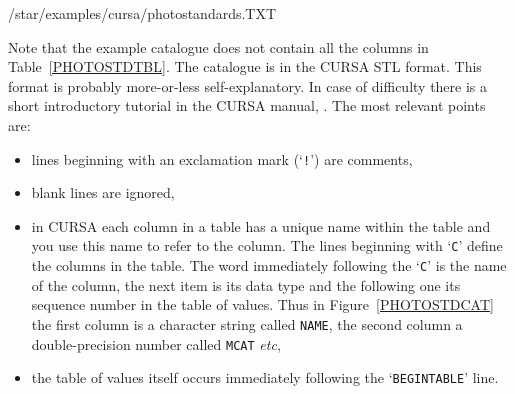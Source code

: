 \documentclass[twoside,11pt,nolof]{starlink}
\begin{document}
\begin{enumerate}
\begin{description}
\begin{terminalv}
/star/examples/cursa/photostandards.TXT
\end{terminalv}

     Note that the example catalogue does not contain all the columns
     in Table~\ref{PHOTOSTDTBL}.  The catalogue is in the CURSA STL
     format.  This format is probably more-or-less self-explanatory.  In
     case of difficulty there is a short introductory tutorial in the CURSA
     manual, \cite{SUN190}.  The most relevant points
     are:

    \begin{itemize}

      \item lines beginning with an exclamation mark (`\texttt{!}') are
       comments,

      \item blank lines are ignored,

      \item in CURSA each column in a table has a unique name within
       the table and you use this name to refer to the column.  The
       lines beginning with `\texttt{C}' define the columns in the table.
       The word immediately following the `\texttt{C}' is the name of the
       column, the next item is its data type and the following one its
       sequence number in the table of values.  Thus in
       Figure~\ref{PHOTOSTDCAT} the first column is a character string
       called \texttt{NAME}, the second column a double-precision number
       called \texttt{MCAT} \emph{etc},

      \item the table of values itself occurs immediately following the
       `\texttt{BEGINTABLE}' line.

    \end{itemize}


\end{description}
\end{enumerate}
\end{document}
